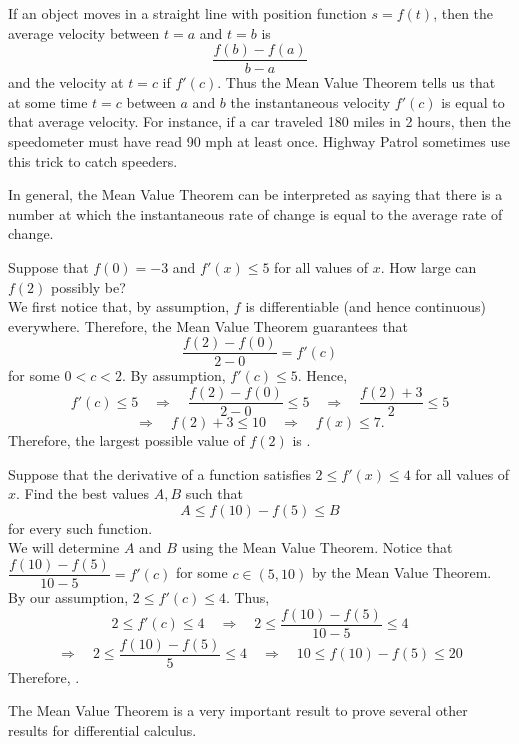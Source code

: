 \documentclass{book}
\begin{document}
\begin{Exam} If an object moves in a straight line with position function $s=f(t)$, then the average velocity between $t=a$ and $t=b$ is \[\dfrac{f(b)-f(a)}{b-a}\] and the velocity at $t=c$ if $f'(c)$. Thus the Mean Value Theorem tells us that at some time $t=c$ between $a$ and $b$ the instantaneous velocity $f'(c)$ is equal to that average velocity. For instance, if a car traveled 180 miles in 2 hours, then the speedometer must have read 90 mph at least once. Highway Patrol sometimes use this trick to catch speeders. 
\end{Exam}\vs

In general, the Mean Value Theorem can be interpreted as saying that there is a number at which the instantaneous rate of change is equal to the average rate of change.

\begin{Exam} Suppose that $f(0) = -3$ and $f'(x) \le 5$ for all values of $x$. How large can $f(2)$ possibly be?\\

We first notice that, by assumption, $f$ is differentiable (and hence continuous) everywhere. Therefore, the Mean Value Theorem guarantees that \[\dfrac{f(2)-f(0)}{2-0} = f'(c)\] for some $0 < c < 2$. By assumption, $f'(c) \le 5$. Hence,
\[ f'(c) \le  5 \quad\Rightarrow\quad \dfrac{f(2)-f(0)}{2-0} \le  5 \quad\Rightarrow\quad  \dfrac{f(2)+3}{2} \le  5\]
\[ \Rightarrow\quad f(2) + 3 \le 10 \quad\Rightarrow\quad  f(x) \le  7.\]
 Therefore, the largest possible value of $f(2)$ is .
\end{Exam}\vs

\begin{Exam} Suppose that the derivative of a function satisfies $2 \le f'(x) \le 4$ for all values of $x$. Find the best values $A, B$ such that \[A\le f(10)-f(5) \le B\]  for every such function.\\

We will determine $A$ and $B$ using the Mean Value Theorem. Notice that $\dfrac{f(10)-f(5)}{10-5} = f'(c)$ for some $c\in (5,10)$ by the Mean Value Theorem. By our assumption, $2 \le f'(c) \le 4$. Thus, 
\[2 \le f'(c) \le 4 \quad\Rightarrow\quad 2 \le \dfrac{f(10)-f(5)}{10-5} \le 4\]
\[\Rightarrow\quad 2\le  \dfrac{f(10)-f(5)}{5} \le 4 \quad\Rightarrow\quad 10 \le f(10) - f(5) \le 20 \]
Therefore, .
\end{Exam}\vs

The Mean Value Theorem is a very important result to prove several other results for differential calculus.
\end{document}
